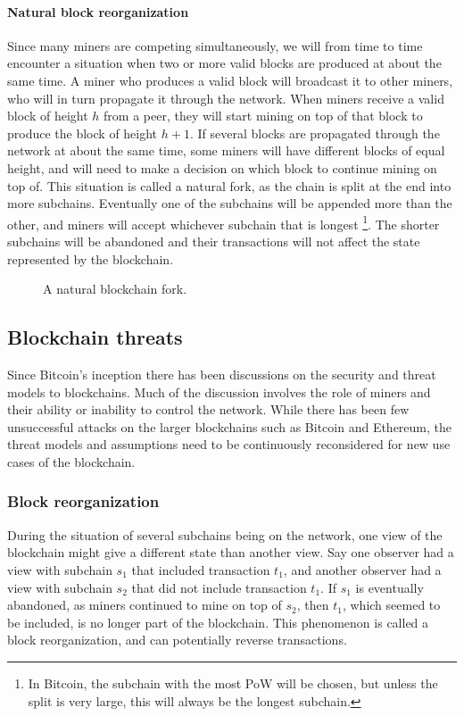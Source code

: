 \paragraph{Natural block reorganization}
Since many miners are competing simultaneously, we will from time to time encounter a situation when two or more valid blocks are produced at about the same time. A miner who produces a valid block will broadcast it to other miners, who will in turn propagate it through the network. When miners receive a valid block of height $h$ from a peer, they will start mining on top of that block to produce the block of height $h+1$. If several blocks are propagated through the network at about the same time, some miners will have different blocks of equal height, and will need to make a decision on which block to continue mining on top of. This situation is called a natural fork, as the chain is split at the end into more subchains. Eventually one of the subchains will be appended more than the other, and miners will accept whichever subchain that is longest \footnote{In Bitcoin, the subchain with the most PoW will be chosen, but unless the split is very large, this will always be the longest subchain.}. The shorter subchains will be abandoned and their transactions will not affect the state represented by the blockchain.

\begin{figure}[htbp]
  \centering
  
  \caption{A natural blockchain fork.}
  \label{fig:blockchain-fork}
\end{figure}


\subsection{Blockchain threats}

Since Bitcoin's inception there has been discussions on the security and threat models to blockchains. Much of the discussion involves the role of miners and their ability or inability to control the network. While there has been few unsuccessful attacks on the larger blockchains such as Bitcoin and Ethereum, the threat models and assumptions need to be continuously reconsidered for new use cases of the blockchain.

\subsubsection{Block reorganization}
During the situation of several subchains being on the network, one view of the blockchain might give a different state than another view. Say one observer had a view with subchain $s_1$ that included transaction $t_1$, and another observer had a view with subchain $s_2$ that did not include transaction $t_1$. If $s_1$ is eventually abandoned, as miners continued to mine on top of $s_2$, then $t_1$, which seemed to be included, is no longer part of the blockchain. This phenomenon is called a block reorganization, and can potentially reverse transactions.

